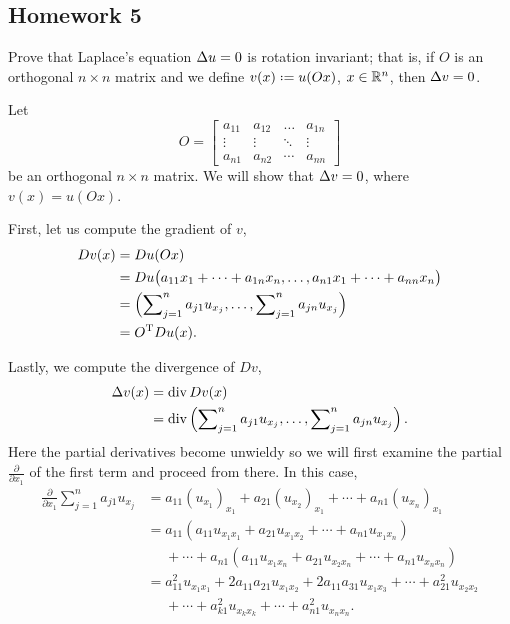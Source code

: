 \subsection{Homework 5}
\begin{problem}
  Prove that Laplace's equation \(\Delta u=0\) is rotation invariant; that
  is, if \(O\) is an orthogonal \(n\times n\) matrix and we define
  \(v(x)\defeq u(Ox)\), \(x\in\mathbb{R}^n\), then \(\Delta v=0\).
\end{problem}
\begin{solution*}
  Let
  \[
    O=
    \begin{bmatrix}
      a_{11}&a_{12}&\dotsc&a_{1n}\\
      \vdots&\vdots&\ddots&\vdots\\
      a_{n1}&a_{n2}&\cdots&a_{nn}
    \end{bmatrix}
  \]
  be an orthogonal \(n\times n\) matrix. We will show that \(\Delta v=0\),
  where \(v(x)=u(Ox)\).

  First, let us compute the gradient of \(v\),
  \begin{align*}
    Dv(x)
    &=Du(Ox)\\
    &=Du\bigl(a_{11}x_1+\dotsb+a_{1n}x_n,\dotsc,a_{n1}x_1+\dotsb+a_{nn}x_n\bigr)\\
    &=\left(\sum\nolimits_{j=1}^na_{j1}u_{x_j},%
      \dotsc,%
      \sum\nolimits_{j=1}^n a_{jn}u_{x_j}\right)\\
    &=O^\rmT Du(x).
  \end{align*}

  Lastly, we compute the divergence of \(Dv\),
  \begin{align*}
    \Lap v(x)
    &=\Div Dv(x)\\
    &=\Div%
      \left(\sum\nolimits_{j=1}^na_{j1}u_{x_j},%
      \dotsc,%
      \sum\nolimits_{j=1}^n a_{jn}u_{x_j}\right).
  \end{align*}
  Here the partial derivatives become unwieldy so we will first examine the
  partial \(\frac{\partial}{\partial x_1}\) of the first term and proceed
  from there. In this case,
  \begin{align*}
    \tfrac{\partial}{\partial x_1}\sum_{j=1}^n a_{j1}u_{x_j}
    &=a_{11}(u_{x_1})_{x_1}%
      +a_{21}(u_{x_2})_{x_1}%
      +\dotsb%
      +a_{n1}(u_{x_n})_{x_1}\\
    &=a_{11}(a_{11}u_{x_1x_1}+a_{21}u_{x_1x_2}+\dotsb+a_{n1}u_{x_1x_n})\\
    &\phantom{{}={}}+\dotsb+a_{n1}(a_{11}u_{x_1x_n}+a_{21}u_{x_2x_n}%
      +\dotsb+a_{n1}u_{x_nx_n})\\
    &=a_{11}^2u_{x_1x_1}+2a_{11}a_{21}u_{x_1x_2}+2a_{11}a_{31}u_{x_1x_3}
      +\dotsb+a_{21}^2u_{x_2x_2}\\
    &\phantom{{}={}}+\dotsb+a_{k1}^2u_{x_kx_k}+\dotsb+a_{n1}^2u_{x_nx_n}.
  \end{align*}


\end{solution*}
